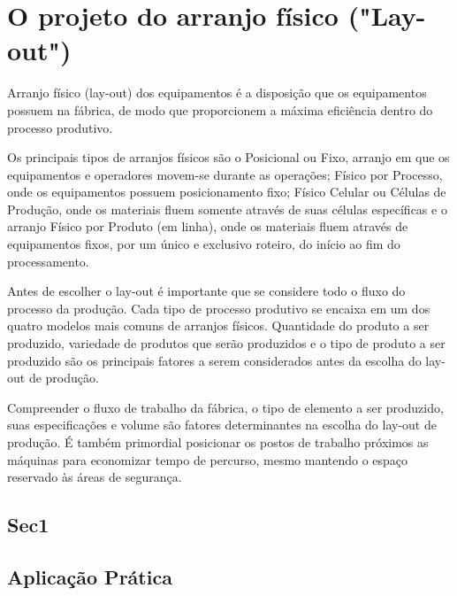 \chapter{O projeto do arranjo físico ("Lay-out")} 
\label{chap:projeto_do_arranjo} 
Arranjo físico (lay-out) dos equipamentos é a disposição que os equipamentos possuem na fábrica, de modo que proporcionem a máxima eficiência dentro do processo produtivo.

Os principais tipos de arranjos físicos são o Posicional ou Fixo, arranjo em que os equipamentos e operadores movem-se durante as operações; Físico por Processo, onde os equipamentos possuem posicionamento fixo; Físico Celular ou Células de Produção, onde os materiais fluem somente através de suas células específicas e o arranjo Físico por Produto (em linha), onde os materiais fluem através de equipamentos fixos, por um único e exclusivo roteiro, do início ao fim do processamento.

Antes de escolher o lay-out é importante que se considere todo o fluxo do processo da produção. Cada tipo de processo produtivo se encaixa em um dos quatro modelos mais comuns de arranjos físicos. Quantidade do produto a ser produzido, variedade de produtos que serão produzidos e o tipo de produto a ser produzido são os principais fatores a serem considerados antes da escolha do lay-out de produção.

Compreender o fluxo de trabalho da fábrica, o tipo de elemento a ser produzido, suas especificações  e volume são fatores determinantes na escolha do lay-out de produção. É também primordial posicionar os postos de trabalho próximos as máquinas para economizar tempo de percurso, mesmo mantendo o espaço reservado às áreas de segurança.
 


\section{Sec1} 
\label{sec:projeto_do_arranjo_sec1} 
 
\section{Aplicação Prática} 
\label{sec:projeto_do_arranjo_aplicacao}